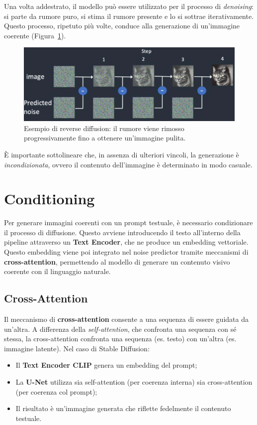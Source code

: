 Una volta addestrato, il modello può essere utilizzato per il processo di \textit{denoising}: si parte da rumore puro, si stima il rumore presente e lo si sottrae iterativamente. Questo processo, ripetuto più volte, conduce alla generazione di un'immagine coerente (Figura~\ref{fig:revDiff}).
\begin{figure}
    \centering
    \includegraphics[width=\textwidth]{figure/ReverseDiffusion.png}
    \caption{Esempio di reverse diffusion: il rumore viene rimosso progressivamente fino a ottenere un’immagine pulita.}
    \label{fig:revDiff}
\end{figure}
È importante sottolineare che, in assenza di ulteriori vincoli, la generazione è \textit{incondizionata}, ovvero il contenuto dell'immagine è determinato in modo casuale.

\section{Conditioning}

Per generare immagini coerenti con un prompt testuale, è necessario condizionare il processo di diffusione. Questo avviene introducendo il testo all’interno della pipeline attraverso un \textbf{Text Encoder}, che ne produce un embedding vettoriale. Questo embedding viene poi integrato nel noise predictor tramite meccanismi di \textbf{cross-attention}, permettendo al modello di generare un contenuto visivo coerente con il linguaggio naturale.

\subsection{Cross-Attention}

Il meccanismo di \textbf{cross-attention} consente a una sequenza di essere guidata da un’altra. A differenza della \textit{self-attention}, che confronta una sequenza con sé stessa, la cross-attention confronta una sequenza (es. testo) con un’altra (es. immagine latente). Nel caso di Stable Diffusion:
\begin{itemize}
    \item Il \textbf{Text Encoder CLIP} genera un embedding del prompt;
    \item La \textbf{U-Net} utilizza sia self-attention (per coerenza interna) sia cross-attention (per coerenza col prompt);
    \item Il risultato è un’immagine generata che riflette fedelmente il contenuto testuale.
\end{itemize}

